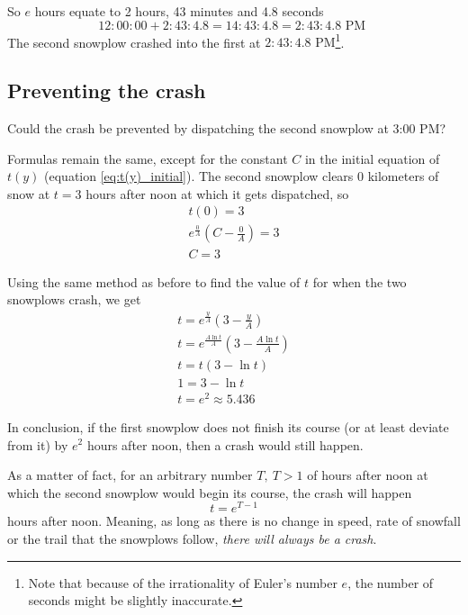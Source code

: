 \documentclass[a4paper,12pt]{article}
\renewcommand*{\textnormal}[1]{\text{ #1 }}
\begin{document}
        So \(e\) hours equate to 2 hours, 43 minutes and 4.8 seconds
        \[
            12{:}00{:}00 + 2{:}43{:}4.8 = 14{:}43{:}4.8 = 2{:}43{:}4.8 \textnormal{PM}
        \]
        The second snowplow crashed into the first at \(2{:}43{:}4.8 \text{ PM}\)\footnote{Note that because of the irrationality of Euler's number \(e\), the number of seconds might be slightly inaccurate.}.
        
    \subsection{Preventing the crash}
        Could the crash be prevented by dispatching the second snowplow at 3:00 PM?

        \hfill \break
        Formulas remain the same, except for the constant \(C\) in the initial equation of \(t(y)\) (equation \eqref{eq:t(y)_initial}).
        The second snowplow clears \(0\) kilometers of snow at \(t = 3\) hours after noon at which it gets dispatched, so
        \begin{gather*}
            t(0) = 3 \\
            e^{\frac{0}{A}}\left(C - \frac{0}{A}\right) = 3 \\
            C = 3
        \end{gather*}

        Using the same method as before to find the value of \(t\) for when the two snowplows crash, we get
        \begin{gather*}
            t = e^{\frac{y}{A}}\left(3-\frac{y}{A}\right) \\
            t = e^\frac{A \ln t}{A}\left(3 - \frac{A \ln t}{A}\right) \\
            t = t(3 - \ln t) \\
            1 = 3 - \ln t \\
            t = e^2 \approx 5.436
        \end{gather*}

        In conclusion, if the first snowplow does not finish its course (or at least deviate from it) by $e^2$ hours after noon, then a crash would still happen.

        \hfill \break
        As a matter of fact, for an arbitrary number $T, \ T > 1$ of hours after noon at which the second snowplow would begin its course, the crash will happen
        \[ t = e^{T-1} \]
        hours after noon. Meaning, as long as there is no change in speed, rate of snowfall or the trail that the snowplows follow, \emph{there will always be a crash}.
    

\newpage \printbibliography
\end{document}
